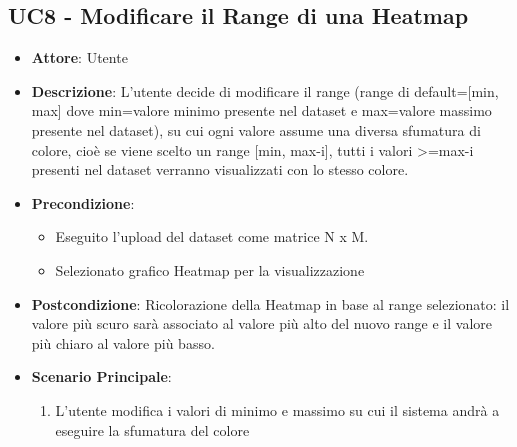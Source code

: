      \subsection{UC8 - Modificare il Range di una Heatmap}
    \begin{itemize}
    \item \textbf{Attore}: Utente
    \item \textbf{Descrizione}: L'utente decide di modificare il range (range di default=[min, max] dove min=valore minimo presente nel dataset e max=valore massimo presente nel dataset), su cui ogni valore assume una diversa sfumatura di colore, cioè se viene scelto un range [min, max-i], tutti i valori >=max-i presenti nel dataset verranno visualizzati con lo stesso colore.
    \item \textbf{Precondizione}: 
    \begin{itemize}
        \item Eseguito l'upload del dataset come matrice N x M.
        \item Selezionato grafico Heatmap per la visualizzazione
    \end{itemize}  
    \item \textbf{Postcondizione}: Ricolorazione della Heatmap in base al range selezionato: il valore più scuro sarà associato al valore più alto del nuovo range e il valore più chiaro al valore più basso.
    \item \textbf{Scenario Principale}: 
    \begin{enumerate}
        \item L'utente modifica i valori di minimo e massimo su cui il sistema andrà a eseguire la sfumatura del colore
    \end{enumerate}  
    \end{itemize}
    
